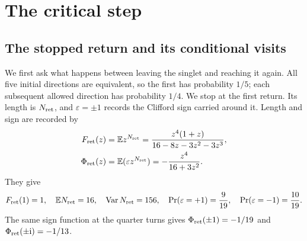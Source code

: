 \documentclass[aps,prx,onecolumn,10pt,notitlepage,nofootinbib,longbibliography]{revtex4-2}
\numberwithin{equation}{section}
\numberwithin{table}{section}
\newcommand{\EE}{\mathbb E}
\newcommand{\Var}{\operatorname{Var}}
\newcommand{\ii}{\mathrm i}
\newcommand{\Fret}{F_{\mathrm{ret}}}
\newcommand{\Phis}{\Phi_{\rm ret}}
\begin{document}
\section{The critical step}
\label{sec:step-four}

\subsection{The stopped return and its conditional visits}
We first ask what happens between leaving the singlet and reaching it again. All five initial directions are equivalent, so the first has probability $1/5$; each subsequent allowed direction has probability $1/4$. We stop at the first return. Its length is $N_{\rm ret}$, and $\varepsilon=\pm1$ records the Clifford sign carried around it. Length and sign are recorded by
\begin{align}
 \Fret(z)&=\EE z^{N_{\rm ret}}=\frac{z^4(1+z)}{16-8z-3z^2-3z^3},\notag\\
 \Phis(z)&=\EE(\varepsilon z^{N_{\rm ret}})=-\frac{z^4}{16+3z^2}.
 \label{eq:returns}
\end{align}
They give
\begin{equation}
 \Fret(1)=1,\quad \EE N_{\rm ret}=16,\quad \Var N_{\rm ret}=156,
 \quad \Pr(\varepsilon=+1)=\frac9{19},\quad
 \Pr(\varepsilon=-1)=\frac{10}{19}.
\end{equation}
The same sign function at the quarter turns gives $\Phis(\pm1)=-1/19$ and $\Phis(\pm\ii)=-1/13$.
\end{document}
